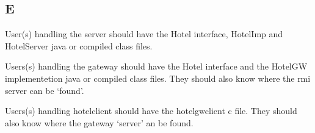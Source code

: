\documentclass[10pt,a4paper]{article}
\begin{document}
\subsection{E}
User(s) handling the server should have the Hotel interface, HotelImp and HotelServer java or compiled class files. 

Users(s) handling the gateway should have the Hotel interface and the HotelGW implementetion java or compiled class files. They should also know where the rmi server can be `found'.

Users(s) handling hotelclient should have the hotelgwclient c file. They should also know where the gateway `server' an be found.
\end{document}
